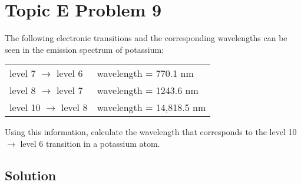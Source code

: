 \documentclass[10pt]{article}
\begin{document}
    \section{Topic E Problem 9}
        The following electronic transitions and the corresponding wavelengths can be seen in the emission spectrum of potassium:
        \begin{center}
            \begin{tabular}{l l}
                level 7 $\rightarrow$ level 6   &wavelength = 770.1 nm\\
                level 8 $\rightarrow$ level 7   &wavelength = 1243.6 nm\\
                level 10 $\rightarrow$ level 8  &wavelength = 14,818.5 nm
            \end{tabular}
        \end{center}
        Using this information, calculate the wavelength that corresponds to the level 10 $\rightarrow$ level 6 transition in a potassium atom.

        \subsection{Solution}

    \pagebreak
    \tableofcontents
\end{document}
